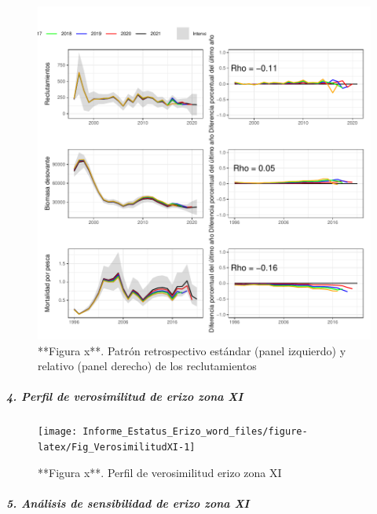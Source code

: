 \documentclass[
]{article}
\begin{document}
\begin{figure}

{\centering \includegraphics{Figuras/Fig_RetrospectivoXI-1} 

}

\caption{**Figura x**.  Patrón retrospectivo estándar (panel izquierdo) y  relativo (panel derecho) de los reclutamientos}\label{fig:Fig_RetrospectivoXI}
\end{figure}

\hypertarget{perfil-de-verosimilitud-de-erizo-zona-xi}{%
\subparagraph{\texorpdfstring{\textbf{\emph{4. Perfil de verosimilitud
de erizo zona
XI}}}{4. Perfil de verosimilitud de erizo zona XI}}\label{perfil-de-verosimilitud-de-erizo-zona-xi}}

\begin{figure}

{\centering \texttt{[image: Informe\_Estatus\_Erizo\_word\_files/figure-latex/Fig\_VerosimilitudXI-1]} 

}

\caption{**Figura x**.  Perfil de verosimilitud erizo zona XI}\label{fig:Fig_VerosimilitudXI}
\end{figure}

\hypertarget{anuxe1lisis-de-sensibilidad-de-erizo-zona-xi}{%
\subparagraph{\texorpdfstring{\textbf{\emph{5. Análisis de sensibilidad
de erizo zona
XI}}}{5. Análisis de sensibilidad de erizo zona XI}}\label{anuxe1lisis-de-sensibilidad-de-erizo-zona-xi}}
\end{document}
